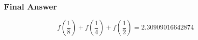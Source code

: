 \subsubsection*{Final Answer}

\[
\boxed{
f\!\left(\frac18\right)+f\!\left(\frac14\right)+f\!\left(\frac12\right)
=2.30909016642874
}
\]
